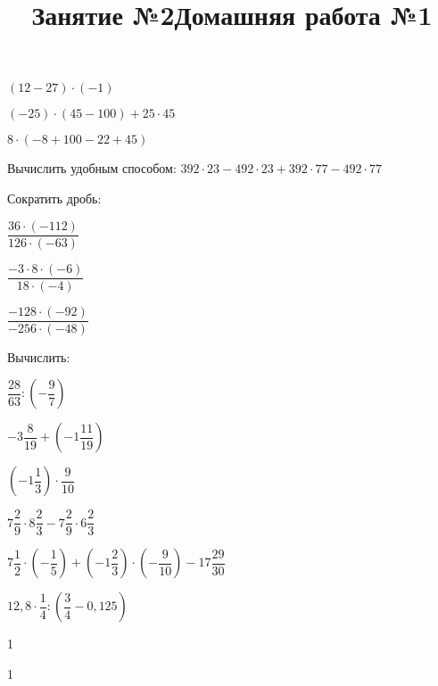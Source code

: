 \begin{listofex}
\begin{enumcols}[itemcolumns=3]
		\item \( (12-27)\cdot(-1) \)
		\item \( (-25)\cdot(45-100)+25\cdot45 \)
		\item \( 8\cdot(-8+100-22+45) \)
	\end{enumcols}
	\item Вычислить удобным способом: \( 392\cdot23-492\cdot23+392\cdot77-492\cdot77 \)
	\item Сократить дробь:
	\begin{enumcols}[itemcolumns=3]
		\item \( \dfrac{36\cdot(-112)}{126\cdot(-63)} \)
		\item \( \dfrac{-3\cdot8\cdot(-6)}{18\cdot(-4)}\)
		\item \( \dfrac{-128\cdot(-92)}{-256\cdot(-48)} \)
	\end{enumcols}
	\item Вычислить:
	\begin{enumcols}[itemcolumns=2]
		\item \( \dfrac{28}{63}:\left( -\dfrac{9}{7} \right) \)
		\item \( -3\dfrac{8}{19}+\left( -1\dfrac{11}{19} \right) \)
		\item \( \left( -1\dfrac{1}{3} \right)\cdot\dfrac{9}{10} \)
		\item \( 7\dfrac{2}{9}\cdot8\dfrac{2}{3}-7\dfrac{2}{9}\cdot6\dfrac{2}{3} \)
		\item \( 7\dfrac{1}{2}\cdot\left( -\dfrac{1}{5} \right)+\left( -1\dfrac{2}{3} \right)\cdot\left( -\dfrac{9}{10} \right)-17\dfrac{29}{30} \)
		\item \( 12,8\cdot\dfrac{1}{4}:\left( \dfrac{3}{4}-0,125 \right) \)
	\end{enumcols}
	
\end{listofex}
\newpage
\title{Занятие №2}
\begin{listofex}
	\item 1
\end{listofex}
\newpage
\title{Домашняя работа №1}
\begin{listofex}
	\item 1
\end{listofex}
\newpage

